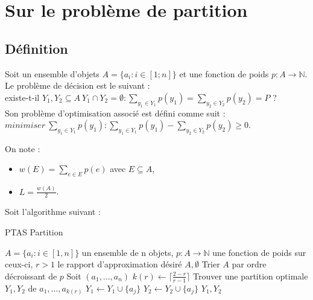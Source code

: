 
\section{Sur le problème de partition}\label{ex5}

\subsection{D\'efinition}\label{ex5_def}
Soit un ensemble d'objets $A = \{a_i : i \in [1;n]\}$ et une fonction de poids $p : A
\rightarrow \mathbb{N}$.\\
Le problème de décision est le suivant : \\
existe-t-il $Y_1,Y_2 \subseteq A\ Y_1 \cap Y_2 = \emptyset: \sum_{y_{1} \in Y_1}p(y_1) = \sum_{y_2 
\in Y_2}p(y_2) = P$ ?\\
Son problème d'optimisation associé est défini comme suit :\\
$minimiser\ \sum_{y_1 \in Y_1}p(y_1) : \sum_{y_1 \in Y_1}p(y_1) - \sum_{y_2 \in Y_2}p(y_2) 
\geq 0$.

On note :
\begin{itemize}
	\item $w(E) = \sum_{e \in E}p(e)$ avec $E \subseteq A$,
	\item $L = \frac{w(A)}{2}$.
\end{itemize}

Soit l'algorithme suivant :

\begin{center}
\begin{algorithm}[H]
\caption{PTAS Partition}\label{ex5_algo}
\begin{algorithmic}[1]
\REQUIRE $A = \{a_i : i \in [1,n]\}$ un ensemble de n objets,
		 $p : A \rightarrow \mathbb{N}$ une fonction de poids sur ceux-ci,
		 $r > 1$ le rapport d'approximation désiré
		\RETURN $A,\emptyset$
	\ENDIF
	\STATE Trier $A$ par ordre décroissant de $p$
	\STATE Soit $(a_1,...,a_n)$
	\STATE $k(r) \leftarrow \lceil\frac{2-r}{r-1}\rceil$
	\STATE Trouver une partition optimale $Y_1,Y_2$ de $a_1,...,a_{k(r)}$
			\STATE $Y_1 \leftarrow Y_1 \cup \{a_j\}$
		\ELSE
			\STATE $Y_2 \leftarrow Y_2 \cup \{a_j\}$
		\ENDIF
	\ENDFOR
	\RETURN $Y_1,Y_2$
\end{algorithmic}
\end{algorithm}
\end{center}

